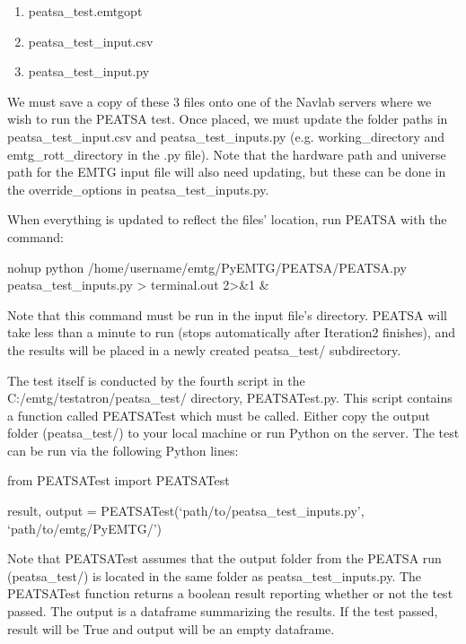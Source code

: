 \documentclass[11pt]{article}
\begin{document}
\begin{enumerate}
	\item peatsa\_test.emtgopt
	\item peatsa\_test\_input.csv
	\item peatsa\_test\_input.py
\end{enumerate}

\noindent We must save a copy of these 3 files onto one of the Navlab servers where we wish to run the PEATSA test. Once placed, we must update the folder paths in peatsa\_test\_input.csv and peatsa\_test\_inputs.py (e.g. working\_directory and emtg\_rott\_directory in the .py file). Note that the hardware path and universe path for the EMTG input file will also need updating, but these can be done in the override\_options in peatsa\_test\_inputs.py.

\noindent When everything is updated to reflect the files' location, run PEATSA with the command:

nohup python /home/username/emtg/PyEMTG/PEATSA/PEATSA.py peatsa\_test\_inputs.py > terminal.out 2>\&1 \&

\noindent Note that this command must be run in the input file's directory. PEATSA will take less than a minute to run (stops automatically after Iteration2 finishes), and the results will be placed in a newly created peatsa\_test/ subdirectory. 

\noindent The test itself is conducted by the fourth script in the C:/emtg/testatron/peatsa\_test/ directory, PEATSATest.py. This script contains a function called PEATSATest which must be called. Either copy the output folder (peatsa\_test/) to your local machine or run Python on the server. The test can be run via the following Python lines:

from PEATSATest import PEATSATest

result, output = PEATSATest(`path/to/peatsa\_test\_inputs.py', `path/to/emtg/PyEMTG/')

\noindent Note that PEATSATest assumes that the output folder from the PEATSA run (peatsa\_test/) is located in the same folder as peatsa\_test\_inputs.py. The PEATSATest function returns a boolean result reporting whether or not the test passed. The output is a dataframe summarizing the results. If the test passed, result will be True and output will be an empty dataframe. 
\end{document}
